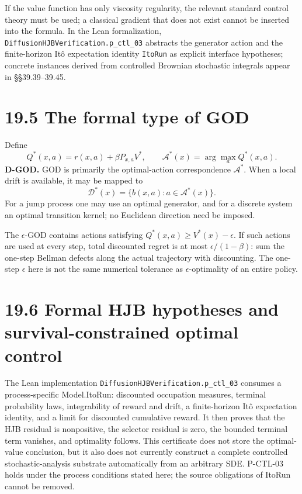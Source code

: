 \documentclass[
  english,
  11pt,
  oneside]{book}
\begin{document}
If the value function has only viscosity regularity, the relevant standard control theory must be used; a classical gradient that does not exist cannot be inserted into the formula. In the Lean formalization, \nolinkurl{DiffusionHJBVerification.p_ctl_03} abstracts the generator action and the finite-horizon Itô expectation identity \texttt{ItoRun} as explicit interface hypotheses; concrete instances derived from controlled Brownian stochastic integrals appear in §§39.39--39.45.

\section{19.5 The formal type of GOD}\label{the-formal-type-of-god}

Define \[Q^*(x,a)=r(x,a)+\beta P_{x,a}V^*,\qquad
\mathcal A^*(x)=\arg\max_aQ^*(x,a).\] \textbf{D-GOD.} GOD is primarily the optimal-action correspondence \(\mathcal A^*\). When a local drift is available, it may be mapped to \[\mathcal D^*(x)=\{b(x,a):a\in\mathcal A^*(x)\}.\] For a jump process one may use an optimal generator, and for a discrete system an optimal transition kernel; no Euclidean direction need be imposed.

The \(\epsilon\)-GOD contains actions satisfying \(Q^*(x,a)\ge V^*(x)-\epsilon\). If such actions are used at every step, total discounted regret is at most \(\epsilon/(1-\beta)\): sum the one-step Bellman defects along the actual trajectory with discounting. The one-step \(\epsilon\) here is not the same numerical tolerance as \(\epsilon\)-optimality of an entire policy.

\section{19.6 Formal HJB hypotheses and survival-constrained optimal control}\label{formal-hjb-hypotheses-and-survival-constrained-optimal-control}

The Lean implementation \nolinkurl{DiffusionHJBVerification.p_ctl_03} consumes a process-specific Model.ItoRun: discounted occupation measures, terminal probability laws, integrability of reward and drift, a finite-horizon Itô expectation identity, and a limit for discounted cumulative reward. It then proves that the HJB residual is nonpositive, the selector residual is zero, the bounded terminal term vanishes, and optimality follows. This certificate does not store the optimal-value conclusion, but it also does not currently construct a complete controlled stochastic-analysis substrate automatically from an arbitrary SDE. P-CTL-03 holds under the process conditions stated here; the source obligations of ItoRun cannot be removed.
\end{document}
